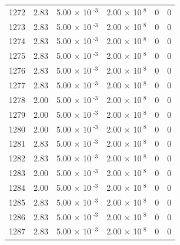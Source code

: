 \documentclass[a4paper,11pt]{article}
\begin{document}
\begin{center}
\begin{longtable}{|R{1.5cm}|R{2.4cm}|R{2.4cm}|R{2.4cm}|R{2.4cm}|R{2.4cm}|}
 1272 &   2.83  &         5.00 $\times$ 10$^{\text{          -3}}$  &         2.00 $\times$ 10$^{\text{           8}}$  & 0  & 0 \\
 1273 &   2.83  &         5.00 $\times$ 10$^{\text{          -3}}$  &         2.00 $\times$ 10$^{\text{           8}}$  & 0  & 0 \\
 1274 &   2.83  &         5.00 $\times$ 10$^{\text{          -3}}$  &         2.00 $\times$ 10$^{\text{           8}}$  & 0  & 0 \\
 1275 &   2.83  &         5.00 $\times$ 10$^{\text{          -3}}$  &         2.00 $\times$ 10$^{\text{           8}}$  & 0  & 0 \\
 1276 &   2.83  &         5.00 $\times$ 10$^{\text{          -3}}$  &         2.00 $\times$ 10$^{\text{           8}}$  & 0  & 0 \\
 1277 &   2.83  &         5.00 $\times$ 10$^{\text{          -3}}$  &         2.00 $\times$ 10$^{\text{           8}}$  & 0  & 0 \\
 1278 &   2.00  &         5.00 $\times$ 10$^{\text{          -3}}$  &         2.00 $\times$ 10$^{\text{           8}}$  & 0  & 0 \\
 1279 &   2.00  &         5.00 $\times$ 10$^{\text{          -3}}$  &         2.00 $\times$ 10$^{\text{           8}}$  & 0  & 0 \\
 1280 &   2.00  &         5.00 $\times$ 10$^{\text{          -3}}$  &         2.00 $\times$ 10$^{\text{           8}}$  & 0  & 0 \\
 1281 &   2.83  &         5.00 $\times$ 10$^{\text{          -3}}$  &         2.00 $\times$ 10$^{\text{           8}}$  & 0  & 0 \\
 1282 &   2.83  &         5.00 $\times$ 10$^{\text{          -3}}$  &         2.00 $\times$ 10$^{\text{           8}}$  & 0  & 0 \\
 1283 &   2.00  &         5.00 $\times$ 10$^{\text{          -3}}$  &         2.00 $\times$ 10$^{\text{           8}}$  & 0  & 0 \\
 1284 &   2.00  &         5.00 $\times$ 10$^{\text{          -3}}$  &         2.00 $\times$ 10$^{\text{           8}}$  & 0  & 0 \\
 1285 &   2.83  &         5.00 $\times$ 10$^{\text{          -3}}$  &         2.00 $\times$ 10$^{\text{           8}}$  & 0  & 0 \\
 1286 &   2.83  &         5.00 $\times$ 10$^{\text{          -3}}$  &         2.00 $\times$ 10$^{\text{           8}}$  & 0  & 0 \\
 1287 &   2.83  &         5.00 $\times$ 10$^{\text{          -3}}$  &         2.00 $\times$ 10$^{\text{           8}}$  & 0  & 0 \\

\end{longtable}
\end{center}
\end{document}
